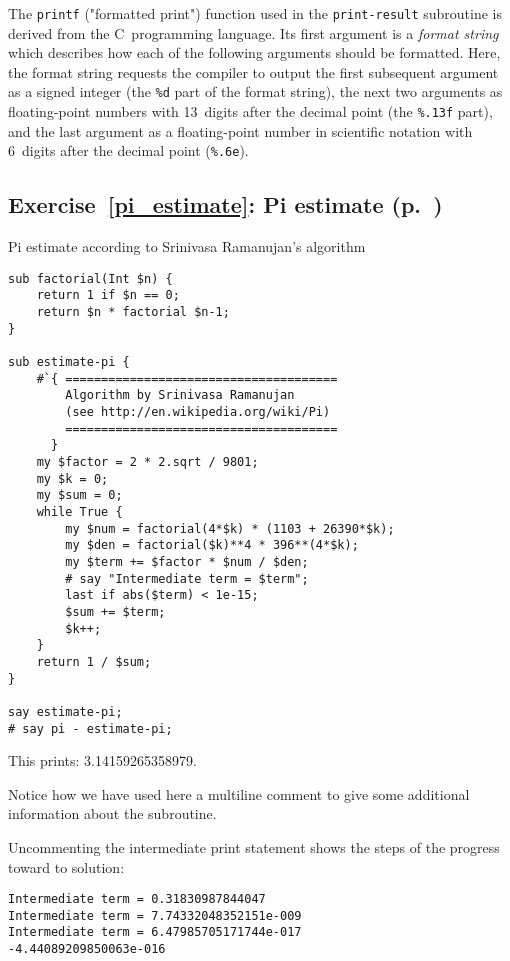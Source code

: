 The {\tt printf} ("formatted print") function used in 
the {\tt print-result} subroutine is derived from the 
C~programming language. Its first argument is a 
\emph{format string} which describes how each of 
the following arguments should be formatted. Here, the 
format string requests the compiler to output the 
first subsequent argument as a signed integer (the 
\verb'%d' part of the format string), the 
next two arguments as floating-point numbers with
13~digits after the decimal point (the \verb'%.13f' part), and 
the last argument as a floating-point number in scientific 
notation with 6~digits after the decimal point (\verb'%.6e').



\subsection{Exercise~\ref{pi_estimate}: Pi estimate (p.~\pageref{pi_estimate})}
\label{sol_pi_estimate}

Pi estimate according to Srinivasa Ramanujan's algorithm


\begin{verbatim}
sub factorial(Int $n) {
    return 1 if $n == 0;
    return $n * factorial $n-1;
}

sub estimate-pi {
    #`{ ======================================
        Algorithm by Srinivasa Ramanujan 
        (see http://en.wikipedia.org/wiki/Pi)
        ======================================
      }
    my $factor = 2 * 2.sqrt / 9801;
    my $k = 0;
    my $sum = 0;
    while True {
        my $num = factorial(4*$k) * (1103 + 26390*$k);
        my $den = factorial($k)**4 * 396**(4*$k);
        my $term += $factor * $num / $den;
        # say "Intermediate term = $term";
        last if abs($term) < 1e-15;
        $sum += $term;
        $k++;
    }
    return 1 / $sum;
}

say estimate-pi;
# say pi - estimate-pi;
\end{verbatim}

This prints: 3.14159265358979.

Notice how we have used here a multiline comment to 
give some additional information about the subroutine.

Uncommenting the intermediate print statement shows the 
steps of the progress toward to solution:

\begin{verbatim}
Intermediate term = 0.31830987844047
Intermediate term = 7.74332048352151e-009
Intermediate term = 6.47985705171744e-017
-4.44089209850063e-016
\end{verbatim}

